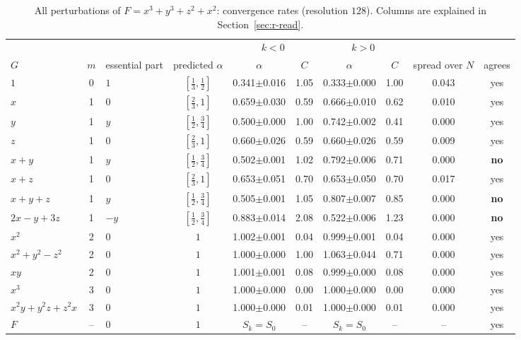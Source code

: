 \documentclass[12pt, a4paper]{article}
\theoremstyle{plain}
\theoremstyle{definition}
\theoremstyle{remark}
\theoremstyle{definition}
\begin{document}
\begin{table}[!h]
\centering
\footnotesize
\begin{adjustbox}{max width=\textwidth}
\begin{tabular}{l c l c c c c c c c}
\toprule
& & & & \multicolumn{2}{c}{$k<0$} & \multicolumn{2}{c}{$k>0$} & & \\
\cmidrule(lr){5-6}\cmidrule(lr){7-8}
$G$ & $m$ & essential part & predicted $\alpha$ & $\alpha$ & $C$ & $\alpha$ & $C$ & spread over $N$ & agrees \\
\midrule
$1$ & 0 & $1$ & $[\tfrac13,\tfrac12]$ & 0.341{\scriptsize$\pm$0.016} & 1.05 & 0.333{\scriptsize$\pm$0.000} & 1.00 & 0.043 & yes \\
$x$ & 1 & $0$ & $[\tfrac23,1]$ & 0.659{\scriptsize$\pm$0.030} & 0.59 & 0.666{\scriptsize$\pm$0.010} & 0.62 & 0.010 & yes \\
$y$ & 1 & $y$ & $[\tfrac12,\tfrac34]$ & 0.500{\scriptsize$\pm$0.000} & 1.00 & 0.742{\scriptsize$\pm$0.002} & 0.41 & 0.000 & yes \\
$z$ & 1 & $0$ & $[\tfrac23,1]$ & 0.660{\scriptsize$\pm$0.026} & 0.59 & 0.660{\scriptsize$\pm$0.026} & 0.59 & 0.009 & yes \\
$x+y$ & 1 & $y$ & $[\tfrac12,\tfrac34]$ & 0.502{\scriptsize$\pm$0.001} & 1.02 & 0.792{\scriptsize$\pm$0.006} & 0.71 & 0.000 & \textbf{no} \\
$x+z$ & 1 & $0$ & $[\tfrac23,1]$ & 0.653{\scriptsize$\pm$0.051} & 0.70 & 0.653{\scriptsize$\pm$0.050} & 0.70 & 0.017 & yes \\
$x+y+z$ & 1 & $y$ & $[\tfrac12,\tfrac34]$ & 0.505{\scriptsize$\pm$0.001} & 1.05 & 0.807{\scriptsize$\pm$0.007} & 0.85 & 0.000 & \textbf{no} \\
$2x-y+3z$ & 1 & $-y$ & $[\tfrac12,\tfrac34]$ & 0.883{\scriptsize$\pm$0.014} & 2.08 & 0.522{\scriptsize$\pm$0.006} & 1.23 & 0.000 & \textbf{no} \\
$x^2$ & 2 & $0$ & $1$ & 1.002{\scriptsize$\pm$0.001} & 0.04 & 0.999{\scriptsize$\pm$0.001} & 0.04 & 0.000 & yes \\
$x^2+y^2-z^2$ & 2 & $0$ & $1$ & 1.000{\scriptsize$\pm$0.000} & 1.00 & 1.063{\scriptsize$\pm$0.044} & 0.71 & 0.000 & yes \\
$xy$ & 2 & $0$ & $1$ & 1.001{\scriptsize$\pm$0.001} & 0.08 & 0.999{\scriptsize$\pm$0.000} & 0.08 & 0.000 & yes \\
$x^3$ & 3 & $0$ & $1$ & 1.000{\scriptsize$\pm$0.000} & 0.00 & 1.000{\scriptsize$\pm$0.000} & 0.00 & 0.000 & yes \\
$x^2y+y^2z+z^2x$ & 3 & $0$ & $1$ & 1.000{\scriptsize$\pm$0.000} & 0.01 & 1.000{\scriptsize$\pm$0.000} & 0.01 & 0.000 & yes \\
$F$ & -- & $0$ & $1$ & $S_k=S_0$ & -- & $S_k=S_0$ & -- & -- & yes \\
\bottomrule
\end{tabular}
\end{adjustbox}
\caption[Rates for $x^3+y^3+z^2+x^2$]{All perturbations of $F=x^3+y^3+z^2+x^2$: convergence rates (resolution $128$). Columns are explained in Section~\ref{sec:r-read}.}
\label{tab:r-A2c-rates}
\end{table}
\end{document}

